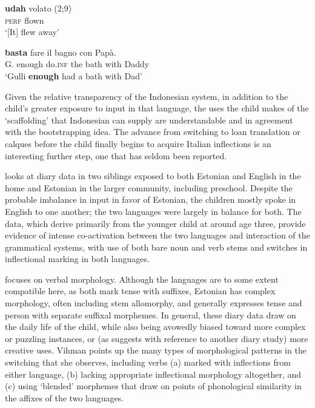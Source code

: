 \documentclass[output=paper]{langscibook}
\begin{document}
\ea%
    \label{ex:vihmannvihmann:2}
\ea \label{ex:vihmannvihmann:2a}
\gll \textbf{{udah}} {volato} (2;9)\\
\textsc{perf}     flown\\
\glt `[It] flew away'

\ex \label{ex:vihmannvihmann:2b}
 \textbf{{basta}} fare   il bagno   con   Papà. \\
 G.  enough  do.\textsc{inf}  the bath  with  Daddy  \\
 \glt `Gulli \textbf{enough} had a bath with Dad'
    \z
\z

Given the relative transparency of the Indonesian system, in addition to the child’s greater exposure to input in that language, the uses the child makes of the ‘scaffolding’ that Indonesian can supply are understandable and in agreement with the bootstrapping idea. The advance from switching to loan translation or calques before the child finally begins to acquire Italian inflections is an interesting further step, one that has seldom been reported.

\citet{Vihman2016,Vihman2018} looks at diary data in two siblings exposed to both Estonian and English in the home and Estonian in the larger community, including preschool. Despite the probable imbalance in input in favor of Estonian, the children mostly spoke in English to one another; the two languages were largely in balance for both. The data, which derive primarily from the younger child at around age three, provide evidence of intense co-activation between the two languages and interaction of the grammatical systems, with use of both bare noun and verb stems and switches in inflectional marking in both languages. 

\citet{Vihman2016} focuses on verbal morphology. Although the languages are to some extent compatible here, as both mark tense with suffixes, Estonian has complex morphology, often including stem allomorphy, and generally expresses tense and person with separate suffixal morphemes. In general, these diary data draw on the daily life of the child, while also being avowedly biased toward more complex or puzzling instances, or (as \citealt{Serratrice2005} suggests with reference to another diary study) more creative uses. Vihman points up the many types of morphological patterns in the switching that she observes, including verbs (a) marked with inflections from either language, (b) lacking appropriate inflectional morphology altogether, and (c) using ‘blended’ morphemes that draw on points of phonological similarity in the affixes of the two languages.
\end{document}
